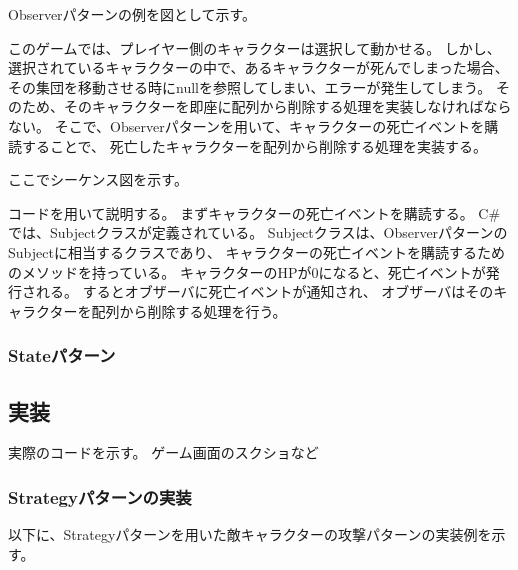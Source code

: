 \documentclass[dvipdfmx,fleqn,article]{jlreq}
\begin{document}
Observerパターンの例を図として示す。

このゲームでは、プレイヤー側のキャラクターは選択して動かせる。
しかし、選択されているキャラクターの中で、あるキャラクターが死んでしまった場合、
その集団を移動させる時にnullを参照してしまい、エラーが発生してしまう。
そのため、そのキャラクターを即座に配列から削除する処理を実装しなければならない。
そこで、Observerパターンを用いて、キャラクターの死亡イベントを購読することで、
死亡したキャラクターを配列から削除する処理を実装する。

ここでシーケンス図を示す。

コードを用いて説明する。
まずキャラクターの死亡イベントを購読する。
C\#では、Subjectクラスが定義されている。
Subjectクラスは、ObserverパターンのSubjectに相当するクラスであり、
キャラクターの死亡イベントを購読するためのメソッドを持っている。
キャラクターのHPが0になると、死亡イベントが発行される。
するとオブザーバに死亡イベントが通知され、
オブザーバはそのキャラクターを配列から削除する処理を行う。

\subsubsection{Stateパターン}



\subsection{実装}
実際のコードを示す。
ゲーム画面のスクショなど

\subsubsection{Strategyパターンの実装}
以下に、Strategyパターンを用いた敵キャラクターの攻撃パターンの実装例を示す。
\end{document}
